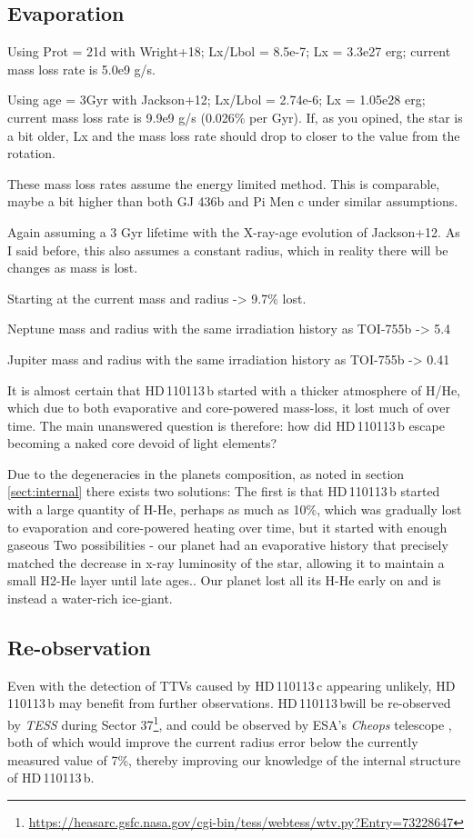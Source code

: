 \documentclass[fleqn,usenatbib]{mnras}
\newcommand{\tess}{{\it TESS}}
\newcommand{\Tplanet}{HD\,110113\,b}
\newcommand{\Tplanetc}{HD\,110113\,c}
\begin{document}
\subsection{Evaporation}\label{sect:evap}
Using Prot = 21d with Wright+18; Lx/Lbol = 8.5e-7; Lx = 3.3e27 erg; current mass loss rate is 5.0e9 g/s.

Using age = 3Gyr with Jackson+12; Lx/Lbol = 2.74e-6; Lx = 1.05e28 erg; current mass loss rate is 9.9e9 g/s (0.026\% per Gyr).
If, as you opined, the star is a bit older, Lx and the mass loss rate should drop to closer to the value from the rotation.

These mass loss rates assume the energy limited method. This is comparable, maybe a bit higher than both GJ 436b and Pi Men c under similar assumptions.

Again assuming a 3 Gyr lifetime with the X-ray-age evolution of Jackson+12. As I said before, this also assumes a constant radius, which in reality there will be changes as mass is lost.


Starting at the current mass and radius -> 9.7\% lost.

Neptune mass and radius with the same irradiation history as TOI-755b -> 5.4%

Jupiter mass and radius with the same irradiation history as TOI-755b -> 0.41%


It is almost certain that \Tplanet{} started with a thicker atmosphere of H/He, which due to both evaporative and core-powered mass-loss, it lost much of over time.
The main unanswered question is therefore: how did \Tplanet{} escape becoming a naked core devoid of light elements?

Due to the degeneracies in the planets composition, as noted in section \ref{sect:internal} there exists two solutions:
The first is that \Tplanet{} started with a large quantity of H-He, perhaps as much as 10\%, which was gradually lost to evaporation and core-powered heating over time, but it started with enough gaseous 
Two possibilities - our planet had an evaporative history that precisely matched the decrease in x-ray luminosity of the star, allowing it to maintain a small H2-He layer until late ages..
Our planet lost all its H-He early on and is instead a water-rich ice-giant.

\subsection{Re-observation}\label{sect:future}
Even with the detection of TTVs caused by \Tplanetc{} appearing unlikely, \Tplanet{} may benefit from further observations.
\Tplanet will be re-observed by \tess{} during Sector 37\footnote{\url{https://heasarc.gsfc.nasa.gov/cgi-bin/tess/webtess/wtv.py?Entry=73228647}}, and could be observed by ESA's \textit{Cheops} telescope \citep{benz2020cheops}, both of which would improve the current radius error below the currently measured value of 7\%, thereby improving our knowledge of the internal structure of \Tplanet{}.
\end{document}
